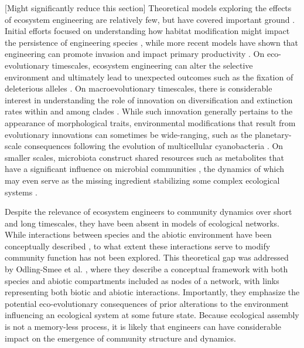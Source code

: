 \documentclass[9pt,twocolumn,twoside]{pnas-new}
\begin{document}
[Might significantly reduce this section] Theoretical models exploring the effects of ecosystem engineering are relatively few, but have covered important ground \cite{Hastings2007,OdlingSmee2013}.
Initial efforts focused on understanding how habitat modification might impact the persistence of engineering species \cite{Gurney1996}, while more recent models have shown that engineering can promote invasion \cite{Cuddington2004} and impact primary productivity \cite{Wright2004}.
On eco-evolutionary timescales, ecosystem engineering can alter the selective environment \cite{Krakauer2009,OdlingSmee2013} and ultimately lead to unexpected outcomes such as the fixation of deleterious alleles \cite{Laland1999}.
On macroevolutionary timescales, there is considerable interest in understanding the role of innovation on diversification and extinction rates within and among clades \cite{Marshall2016}.
While such innovation generally pertains to the appearance of morphological traits, environmental modifications that result from evolutionary innovations can sometimes be wide-ranging, such as the planetary-scale consequences following the evolution of multicellular cyanobacteria \cite{Schirrmeister2013}.
On smaller scales, microbiota construct shared resources such as metabolites that have a significant influence on microbial communities \cite{Kallus2017}, the dynamics of which may even serve as the missing ingredient stabilizing some complex ecological systems \cite{Muscarella2017}.

% 


Despite the relevance of ecosystem engineers to community dynamics over short and long timescales, they have been absent in models of ecological networks.
While interactions between species and the abiotic environment have been conceptually described \cite{Olff2009,Getz2011}, to what extent these interactions serve to modify community function has not been explored.
This theoretical gap was addressed by Odling-Smee et al. \cite{OdlingSmee2013}, where they describe a conceptual framework with both species and abiotic compartments included as nodes of a network, with links representing both biotic and abiotic interactions.
Importantly, they emphasize the potential eco-evolutionary consequences of prior alterations to the environment influencing an ecological system at some future state.
Because ecological assembly is not a memory-less process, it is likely that engineers can have considerable impact on the emergence of community structure and dynamics.
\end{document}
